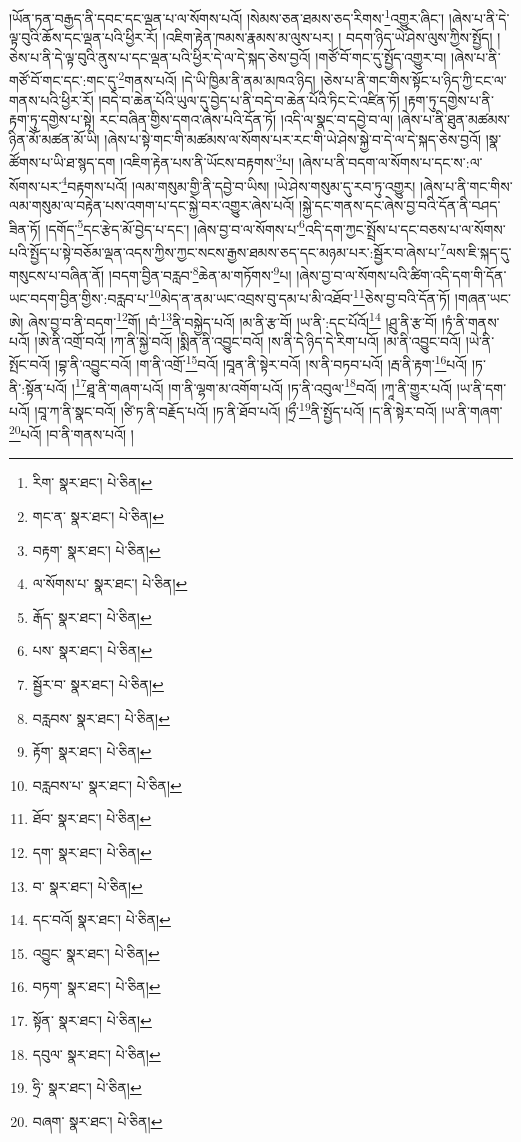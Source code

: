 །ཡོན་ཏན་བརྒྱད་ནི་དབང་དང་ལྡན་པ་ལ་སོགས་པའོ། །སེམས་ཅན་ཐམས་ཅད་རིགས་\footnote{རིག་  སྣར་ཐང་།  པེ་ཅིན། }འགྱུར་ཞིང་། །ཞེས་པ་ནི་དེ་ལྟ་བུའི་ཆོས་དང་ལྡན་པའི་ཕྱིར་རོ། །འཇིག་རྟེན་ཁམས་རྣམས་མ་ལུས་པར། །
བདག་ཉིད་ཡེ་ཤེས་ལུས་ཀྱིས་སྤྱོད། །ཅེས་པ་ནི་དེ་ལྟ་བུའི་ནུས་པ་དང་ལྡན་པའི་ཕྱིར་དེ་ལ་དེ་སྐད་ཅེས་བྱའོ། །གཙོ་བོ་གང་དུ་སྤྱོད་འགྱུར་བ། །ཞེས་པ་ནི་གཙོ་བོ་གང་དང་:གང་དུ་\footnote{གང་ན་  སྣར་ཐང་།  པེ་ཅིན། }གནས་པའོ། །དེ་ཡི་ཁྱིམ་ནི་ནམ་མཁའ་ཉིད། །ཅེས་པ་ནི་གང་གིས་སྟོང་པ་ཉིད་ཀྱི་ངང་ལ་གནས་པའི་ཕྱིར་རོ། །བདེ་བ་ཆེན་པོའི་ཡུལ་དུ་བྱེད་པ་ནི་བདེ་བ་ཆེན་པོའི་ཏིང་ངེ་འཛིན་ཏོ། །རྟག་ཏུ་དགྱེས་པ་ནི་རྟག་ཏུ་དགྱེས་པ་སྟེ། རང་བཞིན་གྱིས་དགའ་ཞེས་པའི་དོན་ཏོ། །འདི་ལ་སྣང་བ་དབྱེ་བ་ལ། །ཞེས་པ་ནི་ཐུན་མཚམས་ཉིན་མོ་མཚན་མོ་ཡི། །ཞེས་པ་སྟེ་གང་གི་མཚམས་ལ་སོགས་པར་རང་གི་ཡེ་ཤེས་སྐྱེ་བ་དེ་ལ་དེ་སྐད་ཅེས་བྱའོ། །སྣ་ཚོགས་པ་ཡི་ཐ་སྙད་དག །འཇིག་རྟེན་པས་ནི་ཡོངས་བརྟགས་\footnote{བརྟག་  སྣར་ཐང་།  པེ་ཅིན། }པ། །ཞེས་པ་ནི་བདག་ལ་སོགས་པ་དང་ས་:ལ་སོགས་པར་\footnote{ལ་སོགས་པ་  སྣར་ཐང་།  པེ་ཅིན། }བརྟགས་པའོ། །ལམ་གསུམ་གྱི་ནི་དབྱེ་བ་ཡིས། །ཡེ་ཤེས་གསུམ་དུ་རབ་ཏུ་འགྱུར། །ཞེས་པ་ནི་གང་གིས་ལམ་གསུམ་ལ་བརྟེན་པས་འགག་པ་དང་སྐྱེ་བར་འགྱུར་ཞེས་པའོ། །སྐྱེ་དང་གནས་དང་ཞེས་བྱ་བའི་དོན་ནི་བཤད་ཟིན་ཏོ། །དགོད་\footnote{རྒོད་  སྣར་ཐང་།  པེ་ཅིན། }དང་རྩེད་མོ་བྱེད་པ་དང་། །ཞེས་བྱ་བ་ལ་སོགས་པ་\footnote{པས་  སྣར་ཐང་།  པེ་ཅིན། }འདི་དག་ཀྱང་སྤྲོས་པ་དང་བཅས་པ་ལ་སོགས་པའི་སྤྱོད་པ་སྟེ་བཅོམ་ལྡན་འདས་ཀྱིས་ཀྱང་སངས་རྒྱས་ཐམས་ཅད་དང་མཉམ་པར་:སྦྱོར་བ་ཞེས་པ་\footnote{སྦྱོར་བ་  སྣར་ཐང་།  པེ་ཅིན། }ལས་ཇི་སྐད་དུ་གསུངས་པ་བཞིན་ནོ། །བདག་བྱིན་བརླབ་\footnote{བརླབས་  སྣར་ཐང་།  པེ་ཅིན། }ཆེན་མ་གཏོགས་\footnote{རྟོག་  སྣར་ཐང་།  པེ་ཅིན། }པ། །ཞེས་བྱ་བ་ལ་སོགས་པའི་ཚིག་འདི་དག་གི་དོན་ཡང་བདག་བྱིན་གྱིས་:བརླབ་པ་\footnote{བརླབས་པ་  སྣར་ཐང་།  པེ་ཅིན། }མེད་ན་ནམ་ཡང་འབྲས་བུ་དམ་པ་མི་འཐོབ་\footnote{ཐོབ་  སྣར་ཐང་།  པེ་ཅིན། }ཅེས་བྱ་བའི་དོན་ཏོ། །གཞན་ཡང་ཨེ། ཞེས་བྱ་བ་ནི་བདག་\footnote{དག་  སྣར་ཐང་།  པེ་ཅིན། }གོ། །བཾ་\footnote{བ་  སྣར་ཐང་།  པེ་ཅིན། }ནི་བསྐྱེད་པའོ། །མ་ནི་རྩ་བོ། །ཡ་ནི་:དང་པོའོ།\footnote{དང་བའོ།  སྣར་ཐང་།  པེ་ཅིན། } །ཤྲུ་ནི་རྩ་བོ། །ཏཾ་ནི་གནས་པའོ། །ཨེ་ནི་འགྲོ་བའོ། །ཀ་ནི་སྐྱེ་བའོ། །སྨིན་ནི་འབྱུང་བའོ། །ས་ནི་དེ་ཉིད་དེ་རིག་པའོ། །མ་ནི་འབྱུང་བའོ། །ཡེ་ནི་སྤོང་བའོ། །བྷ་ནི་འབྱུང་བའོ། །ག་ནི་འགྲོ་\footnote{འབྱུང་  སྣར་ཐང་།  པེ་ཅིན། }བའོ། །བཱན་ནི་སྟེར་བའོ། །ས་ནི་བཏབ་པའོ། །རྦ་ནི་རྟག་\footnote{བཏག་  སྣར་ཐང་།  པེ་ཅིན། }པའོ། །ཏ་ནི་:སྟོན་པའོ། །\footnote{སྟོན་  སྣར་ཐང་།  པེ་ཅིན། }ཐཱ་ནི་གཞག་པའོ། །ག་ནི་ལྷག་མ་འགོག་པའོ། །ཏ་ནི་འབུལ་\footnote{དབུལ་  སྣར་ཐང་།  པེ་ཅིན། }བའོ། །ཀཱ་ནི་གྱུར་པའོ། །ཡ་ནི་དག་པའོ། །བཱ་ཀ་ནི་སྣང་བའོ། །ཙི་ཏ་ནི་བརྗོད་པའོ། །ཏ་ནི་ཐོབ་པའོ། །ཧྲྀ་\footnote{ཧྲི་  སྣར་ཐང་།  པེ་ཅིན། }ནི་སྤྱོད་པའོ། །ད་ནི་སྟེར་བའོ། །ཡ་ནི་གཞག་\footnote{བཞག་  སྣར་ཐང་།  པེ་ཅིན། }པའོ། །བ་ནི་གནས་པའོ། །
